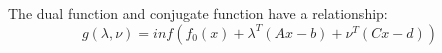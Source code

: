 \documentclass[runningheads]{llncs}
\begin{document}
The dual function and conjugate function have a relationship:
\begin{equation}
g(\lambda, \nu) = inf (f_0(x) + \lambda^T(Ax-b) + \nu^T(Cx-d))
\end{equation}

%
%
%
% 
% 
%




\end{document}
